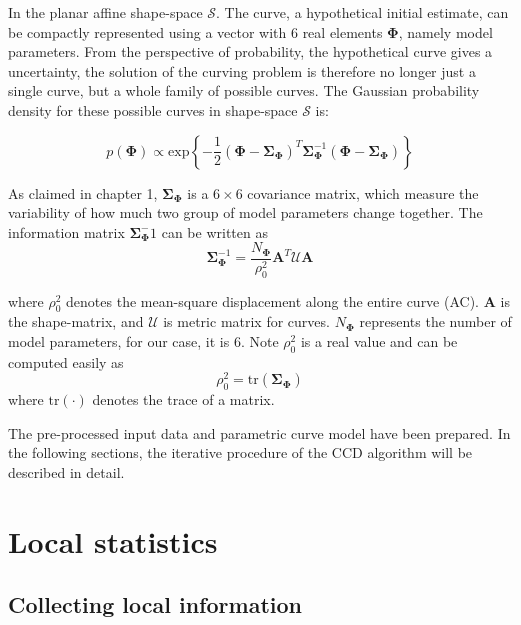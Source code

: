 In the planar affine shape-space $\mathcal{S}$. The curve, a
hypothetical initial estimate, can be compactly represented using a
vector with 6 real elements $\mathbf{\Phi}$, namely model
parameters. From the perspective of probability, the hypothetical
curve gives a uncertainty, the solution of the curving problem is
therefore no longer just a single curve, but a whole family of
possible curves. The Gaussian probability density for these possible
curves in shape-space $\mathcal{S}$ is:

\begin{equation}
  \label{eq:5.1}
   p(\mathbf{\Phi}) \propto
\mathrm{exp} \left\{ -\frac{1}{2} (\mathbf{\Phi} -
  \mathbf{\Sigma}_{\mathbf{\Phi}})^T \mathbf{\Sigma}_{\mathbf{\Phi}}^{-1} (\mathbf{\Phi} -
  \mathbf{\Sigma}_{\mathbf{\Phi}}) \right\}
\end{equation}

As claimed in chapter 1, $\mathbf{\Sigma}_{\mathbf{\Phi}}$ is a $6 \times 6$ 
covariance matrix, which measure the variability of
how much two group of model parameters change together. The
information matrix $\mathbf{\Sigma}_{\mathbf{\Phi}}^-1$ can be
written as 
\begin{equation}
  \label{eq:5.2}
  \mathbf{\Sigma}_{\mathbf{\Phi}}^{-1} = \frac{N_{\mathbf{\Phi}}}{\rho_0^2} \mathbf{A}^T\mathcal{U}\mathbf{A}
\end{equation}

where $\rho_0^2$ denotes the mean-square displacement along the entire
curve (AC). $\mathbf{A}$ is the shape-matrix, and $\mathcal{U}$ is
metric matrix for curves. $N_{\mathbf{\Phi}}$ represents
the number of model parameters, for our case, it is 6. Note $\rho_0^2$
is a real value and can be computed easily as 
\begin{equation}
  \label{eq:5.3}
  \rho_0^2 = \mathrm{tr}(\mathbf{\Sigma}_{\mathbf{\Phi}})
\end{equation}
where $\mathrm{tr}(\cdot)$ denotes the trace of a matrix.

The pre-processed input data and parametric curve model have been
prepared. In the following sections, the iterative procedure of the
CCD algorithm will be described in detail.

\section{Local statistics}
\label{sec:ls}

\subsection{Collecting local information}
\label{sec:cls}


